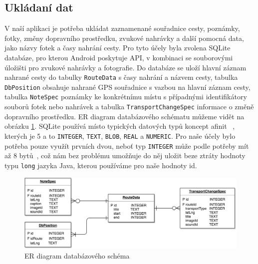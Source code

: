 \documentclass[czech,master,public,dept460,male,java,cpdeclaration]{diploma}
\begin{document}
\subsection{Ukládaní dat}
V naší aplikaci je potřeba ukládat zaznamenané souřadnice cesty, poznámky, fotky, změny dopravního
prostředku, zvukové nahrávky a další pomocná data, jako názvy fotek a časy nahrání cesty. Pro tyto
účely byla zvolena SQLite databáze, pro kterou Android poskytuje API, v kombinaci se souborovými úložišti
pro zvukové nahrávky a fotografie. Do databáze se uloží hlavní záznam nahrané cesty do tabulky \texttt{RouteData}
s časy nahrání a názvem cesty, tabulka \texttt{DbPosition} obsahuje nahrané GPS souřadnice s vazbou
na hlavní záznam cesty, tabulka \texttt{NoteSpec} poznámky ke konkrétnímu místu s případnými identifikátory
souborů fotek nebo nahrávek a tabulka \texttt{TransportChangeSpec} informace o změně dopravního prostředku.
ER diagram databázového schématu můžeme vidět na obrázku \ref{fig:db_er}. SQLite používá místo typických datových typů koncept afinit
~\cite{sqlitetypes}, kterých je 5 a to \texttt{INTEGER}, \texttt{TEXT}, \texttt{BLOB}, \texttt{REAL} a \texttt{NUMERIC}.
Pro naše účely bylo potřeba pouze využít prvních dvou, neboť typ \texttt{INTEGER} může podle potřeby
mít až 8 bytů~\cite{sqlitetypes}, což nám bez problému umožňuje do něj uložit beze ztráty hodnoty typu
\texttt{long} jazyka Java, kterou používáme pro naše hodnoty id.


\begin{figure}[H]
        \centering
                \includegraphics[scale=0.2]{img/db_er.png}
        \caption{ER diagram databázového schéma}
        \label{fig:db_er}
\end{figure}
\end{document}

